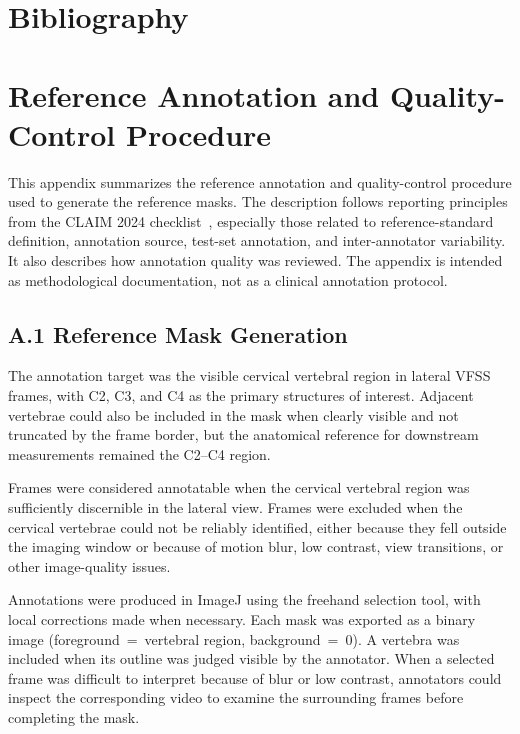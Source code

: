 \documentclass[
  msc,
  american
]{ThesisPUC_v2}
\begin{document}
\renewcommand{\bibsection}{}
\chapter{Bibliography}
\label{chap:bibliography}

  \arial
  
  \normalfont


\appendix

\chapter{Reference Annotation and Quality-Control Procedure}
\label{app:annotation}

This appendix summarizes the reference annotation and quality-control procedure used to generate the reference masks. The description follows reporting principles from the CLAIM 2024 checklist~\citep{ref_tejani2024claim}, especially those related to reference-standard definition, annotation source, test-set annotation, and inter-annotator variability. It also describes how annotation quality was reviewed. The appendix is intended as methodological documentation, not as a clinical annotation protocol.

\section*{A.1 Reference Mask Generation}

The annotation target was the visible cervical vertebral region in lateral VFSS frames, with C2, C3, and C4 as the primary structures of interest. Adjacent vertebrae could also be included in the mask when clearly visible and not truncated by the frame border, but the anatomical reference for downstream measurements remained the C2--C4 region.

Frames were considered annotatable when the cervical vertebral region was sufficiently discernible in the lateral view. Frames were excluded when the cervical vertebrae could not be reliably identified, either because they fell outside the imaging window or because of motion blur, low contrast, view transitions, or other image-quality issues.

Annotations were produced in ImageJ using the freehand selection tool, with local corrections made when necessary. Each mask was exported as a binary image (foreground~=~vertebral region, background~=~0). A vertebra was included when its outline was judged visible by the annotator. When a selected frame was difficult to interpret because of blur or low contrast, annotators could inspect the corresponding video to examine the surrounding frames before completing the mask.
\end{document}
